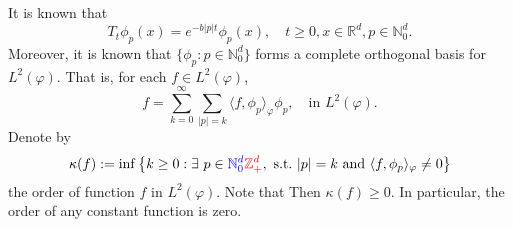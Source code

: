 \documentclass[12pt,oneside,english]{amsart}
\theoremstyle{plain}
\theoremstyle{definition}
\numberwithin{equation}{section}
\newcommand{\added}[1]{{\color{blue}#1}}\newcommand{\deleted}[1]{{\color{red}#1}}
\begin{document}
    It is known that
\begin{equation}\label{semigroupformula}
    T_t\phi_p(x)
    =e^{-b|p|t}\phi_p(x),
    \quad t\geq 0, x\in \mathbb{R}^d, p\in \mathbb N_0^d.
\end{equation}
    Moreover, \deleted{it is known that} $\{\phi_p: p \in \mathbb N_0^d\}$ forms a complete orthogonal basis for $L^2(\varphi)$.
    That is, for each $f\in L^2(\varphi)$,
\begin{equation}\label{semicomp1}
    f
    =\sum_{k=0}^{\infty}\sum_{|p|=k}\langle f, \phi_p \rangle_{\varphi} \phi_p,
    \quad \text{in~} L^2(\varphi).
\end{equation}
    Denote by
\begin{equation}\label{order}
    \kappa(f)
    :=\inf \left \{k\geq 0: \exists ~ p\in \added{ \mathbb N_0^d }\deleted{ \mathbb{Z}_+^d},{\rm ~s.t.~}|p|=k {\rm ~and~}  \langle f, \phi_p \rangle_{\varphi}\neq 0\right \}
\end{equation}
    the order of function $f$ in $L^2(\varphi)$.
    \added{ Note that }\deleted{ Then} $ \kappa(f)\geq 0$.
    In particular, the order of any constant function is zero.
\end{document}
